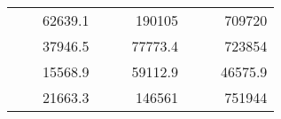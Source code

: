 \begin{table}[]
\begin{tabular}{|ccrccrccc}
\rowcolor[HTML]{DDFDFF} 
\multicolumn{1}{|c|}{\cellcolor[HTML]{FFFFC7}}                                & \multicolumn{1}{c|}{\cellcolor[HTML]{DDFDFF}}                      & \multicolumn{1}{r|}{\cellcolor[HTML]{DAE8FC}62639.1}   & \multicolumn{1}{c|}{\cellcolor[HTML]{FFFFC7}}                                & \multicolumn{1}{c|}{\cellcolor[HTML]{DDFDFF}}                       & \multicolumn{1}{r|}{\cellcolor[HTML]{DDFDFF}190105}    & \multicolumn{1}{c|}{\cellcolor[HTML]{FFFFC7}}                                & \multicolumn{1}{c|}{\cellcolor[HTML]{DDFDFF}}                      & \multicolumn{1}{r|}{\cellcolor[HTML]{DDFDFF}709720}    \\ \cline{3-3} \cline{6-6} \cline{9-9} 
\multicolumn{1}{|c|}{\cellcolor[HTML]{FFFFC7}}                                & \multicolumn{1}{c|}{\cellcolor[HTML]{DDFDFF}}                      & \multicolumn{1}{r|}{\cellcolor[HTML]{DDFDFF}37946.5}   & \multicolumn{1}{c|}{\cellcolor[HTML]{FFFFC7}}                                & \multicolumn{1}{c|}{\cellcolor[HTML]{DDFDFF}}                       & \multicolumn{1}{r|}{\cellcolor[HTML]{DAE8FC}77773.4}   & \multicolumn{1}{c|}{\cellcolor[HTML]{FFFFC7}}                                & \multicolumn{1}{c|}{\cellcolor[HTML]{DDFDFF}}                      & \multicolumn{1}{r|}{\cellcolor[HTML]{DAE8FC}723854}    \\ \cline{3-3} \cline{6-6} \cline{9-9} 
\rowcolor[HTML]{DDFDFF} 
\multicolumn{1}{|c|}{\cellcolor[HTML]{FFFFC7}}                                & \multicolumn{1}{c|}{\cellcolor[HTML]{DDFDFF}}                      & \multicolumn{1}{r|}{\cellcolor[HTML]{DAE8FC}15568.9}   & \multicolumn{1}{c|}{\cellcolor[HTML]{FFFFC7}}                                & \multicolumn{1}{c|}{\cellcolor[HTML]{DDFDFF}}                       & \multicolumn{1}{r|}{\cellcolor[HTML]{DDFDFF}59112.9}   & \multicolumn{1}{c|}{\cellcolor[HTML]{FFFFC7}}                                & \multicolumn{1}{c|}{\cellcolor[HTML]{DDFDFF}}                      & \multicolumn{1}{r|}{\cellcolor[HTML]{DDFDFF}46575.9}   \\ \cline{3-3} \cline{6-6} \cline{9-9} 
\multicolumn{1}{|c|}{\cellcolor[HTML]{FFFFC7}}                                & \multicolumn{1}{c|}{\cellcolor[HTML]{DDFDFF}}                      & \multicolumn{1}{r|}{\cellcolor[HTML]{DDFDFF}21663.3}   & \multicolumn{1}{c|}{\cellcolor[HTML]{FFFFC7}}                                & \multicolumn{1}{c|}{\cellcolor[HTML]{DDFDFF}}                       & \multicolumn{1}{r|}{\cellcolor[HTML]{DAE8FC}146561}    & \multicolumn{1}{c|}{\cellcolor[HTML]{FFFFC7}}                                & \multicolumn{1}{c|}{\cellcolor[HTML]{DDFDFF}}                      & \multicolumn{1}{r|}{\cellcolor[HTML]{DAE8FC}751944}    \\ \cline{3-3} \cline{6-6} \cline{9-9} 

\end{tabular}
\end{table}
